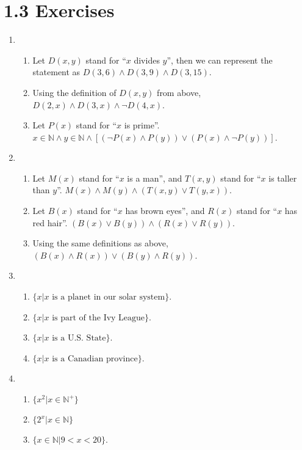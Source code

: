\documentclass{article}
\begin{document}
\section*{1.3 Exercises}
\begin{enumerate}
\item
  \begin{enumerate}
  \item
    Let $D(x, y)$ stand for ``$x$ divides $y$'', then we can represent the statement as $D(3,6) \land D(3,9) \land D(3,15)$.
  \item
    Using the definition of $D(x, y)$ from above, $D(2,x) \land D(3,x) \land \lnot D(4,x)$.
  \item
    Let $P(x)$ stand for ``$x$ is prime''.  $x \in \mathbb{N} \land y \in \mathbb{N} \land [(\lnot P(x) \land P(y)) \lor (P(x) \land \lnot P(y))]$.
  \end{enumerate}
\item
  \begin{enumerate}
    \item
      Let $M(x)$ stand for ``$x$ is a man'', and $T(x,y)$ stand for ``$x$ is taller than $y$''.	 $M(x) \land M(y) \land (T(x,y) \lor T(y,x))$.
    \item
      Let $B(x)$ stand for ``$x$ has brown eyes'', and $R(x)$ stand for ``$x$ has red hair''.  $(B(x) \lor B(y)) \land (R(x) \lor R(y))$.
    \item
      Using the same definitions as above, $(B(x) \land R(x)) \lor (B(y) \land R(y))$.

  \end{enumerate}
\item
  \begin{enumerate}
  \item
    $\{x | x \text{ is a planet in our solar system}\}$.
  \item
    $\{x | x \text{ is part of the Ivy League}\}$.
  \item
    $\{x | x \text{ is a U.S. State}\}$.
  \item
    $\{x | x \text{ is a Canadian province}\}$.
  \end{enumerate}
\item
  \begin{enumerate}
  \item
    $\{x^{2} | x \in \mathbb{N}^{+}\}$
  \item
    $\{2^{x} | x \in \mathbb{N}\}$
  \item
    $\{x \in \mathbb{N} | 9 < x < 20\}$.


\end{enumerate}
\end{enumerate}
\end{document}
